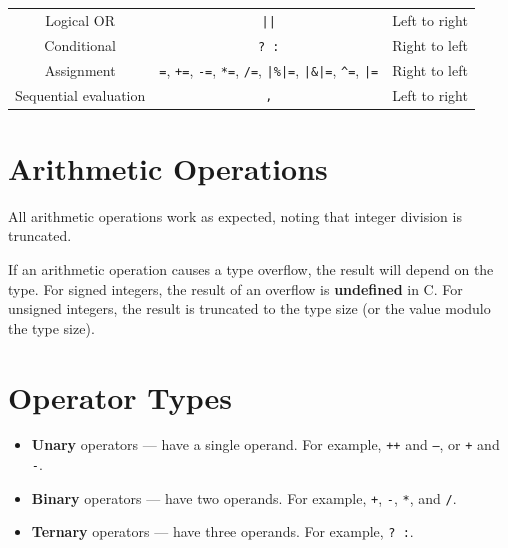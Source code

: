 \documentclass{report}
\begin{document}
\begin{table}[H]
\begin{tabular}{c c c}
        Logical OR                    & \texttt{||}                                                                                                                                                                                                        & Left to right                  \\
        Conditional                   & \texttt{? :}                                                                                                                                                                                                       & Right to left                  \\ %
        Assignment                    & \texttt{=}, \texttt{+=}, \texttt{-=}, \texttt{*=}, \texttt{/=}, \texttt{|\%|=}, \texttt{|\&|=}, \texttt{^=}, \texttt{|=} & Right to left                  \\
        Sequential evaluation         & \texttt{,}                                                                                                                                                                                                         & Left to right                  \\
        \bottomrule
    \end{tabular}
\end{table}
\section{Arithmetic Operations}
All arithmetic operations work as expected, noting that integer division is truncated.

If an arithmetic operation causes a type overflow, the result will depend on the type.
For signed integers, the result of an overflow is \textbf{undefined} in C. For unsigned integers,
the result is truncated to the type size (or the value modulo the type size).
\section{Operator Types}
\begin{itemize}
    \item \textbf{Unary} operators --- have a single operand. For example, \texttt{++} and \texttt{--}, or \texttt{+} and \texttt{-}.
    \item \textbf{Binary} operators --- have two operands. For example, \texttt{+}, \texttt{-}, \texttt{*}, and \texttt{/}.
    \item \textbf{Ternary} operators --- have three operands. For example, \texttt{? :}. %
\end{itemize}
\end{document}
